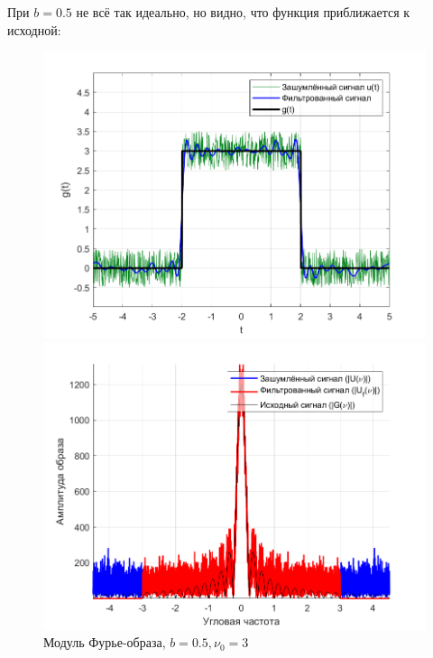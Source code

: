 \documentclass[a4paper]{article}
\begin{document}
При $b = 0.5$ не всё так идеально, но видно, что функция приближается к исходной:

\begin{figure}[H]
    \begin{minipage}{0.5\textwidth}
        \centering
        \includegraphics[width=\textwidth]{part1/0.5_3.png}
        \caption{$b=0.5, \nu_0 = 3$}
    \end{minipage}    
    \begin{minipage}{0.5\textwidth}
        \centering
        \includegraphics[width=\textwidth]{part1/0.5_3_Fourier.png}
        \caption{Модуль Фурье-образа, $b=0.5, \nu_0 = 3$}
    \end{minipage}
\end{figure}\
\end{document}
